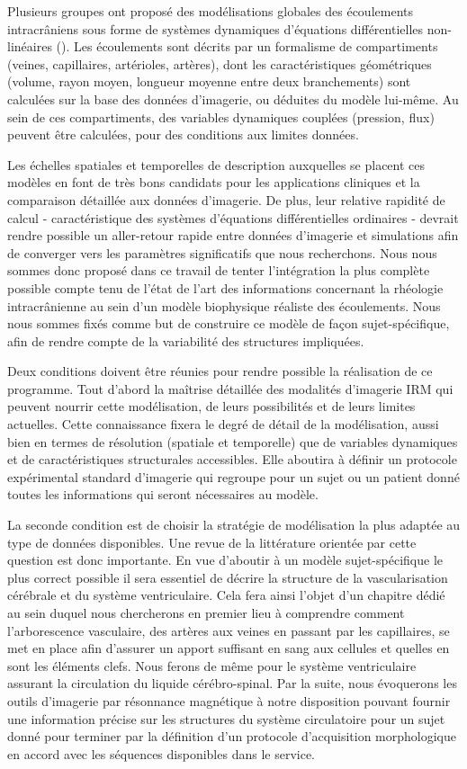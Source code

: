 Plusieurs groupes ont proposé des modélisations globales des écoulements intracrâniens sous forme de systèmes dynamiques d'équations différentielles non-linéaires (\cite{Sorek1988}). Les écoulements sont décrits par 
un formalisme de compartiments (veines, capillaires, artérioles, artères), dont les caractéristiques géométriques (volume, rayon moyen, longueur moyenne entre deux branchements) sont calculées sur la 
base des données d'imagerie, ou déduites du modèle lui-même. Au sein de ces compartiments, des variables dynamiques couplées (pression, flux) peuvent être calculées, pour des conditions aux limites 
données.

Les échelles spatiales et temporelles de description auxquelles se placent ces modèles en font de très bons candidats pour les applications cliniques et la comparaison détaillée aux données d'imagerie. De plus, leur relative rapidité de calcul - caractéristique des systèmes d'équations différentielles
ordinaires - devrait rendre possible un aller-retour rapide entre données d'imagerie et simulations afin de converger vers les paramètres significatifs que nous recherchons.
Nous nous sommes donc proposé dans ce travail de tenter l'intégration la plus complète possible compte tenu de l'état de l'art des informations concernant la rhéologie intracrânienne au sein 
d'un modèle biophysique réaliste des écoulements. Nous nous sommes fixés comme but de construire ce modèle de façon sujet-spécifique, afin de rendre compte de la variabilité des structures 
impliquées.

Deux conditions doivent être réunies pour rendre possible la réalisation de ce programme. Tout d'abord la maîtrise détaillée des modalités d'imagerie IRM qui peuvent nourrir cette modélisation, 
de leurs possibilités et de leurs limites actuelles. Cette connaissance fixera le degré de détail de la modélisation, aussi bien en termes de résolution (spatiale et temporelle) que de variables 
dynamiques et de caractéristiques structurales accessibles. Elle aboutira à définir un protocole expérimental standard d'imagerie qui regroupe pour un sujet ou un patient donné toutes les informations 
qui seront nécessaires au modèle.

La seconde condition est de choisir la stratégie de modélisation la plus adaptée au type de données disponibles. Une revue de la littérature orientée par cette question est donc importante.
En vue d’aboutir à un modèle sujet-spécifique le plus correct possible il sera essentiel de décrire la structure de la vascularisation cérébrale et du système ventriculaire. Cela fera ainsi l’objet 
d’un chapitre dédié au sein duquel nous chercherons en premier lieu à comprendre comment l’arborescence vasculaire, des artères aux veines en passant par les capillaires, se met en place afin d’assurer 
un apport suffisant en sang aux cellules et quelles en sont les éléments clefs. Nous ferons de même pour le système ventriculaire assurant la circulation du liquide cérébro-spinal. Par la suite, 
nous évoquerons les outils d’imagerie par résonnance magnétique à notre disposition pouvant fournir une information précise sur les structures du système circulatoire pour un sujet donné pour terminer 
par la définition d’un protocole d’acquisition morphologique en accord avec les séquences disponibles dans le service.


